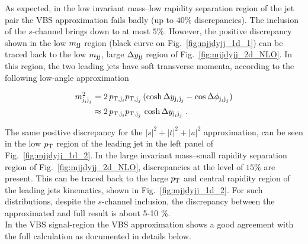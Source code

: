 As expected, in the low invariant mass--low rapidity separation region of the jet pair the VBS approximation fails badly (up to $40\%$ discrepancies).
The inclusion of the $s$-channel brings down to at most $5\%$.
However, the positive discrepancy shown in the low $m_{\text{j}\text{j}}$ region (black curve on Fig.~\ref{fig:mjjdyjj_1d_1}) can be traced back to the low $m_{\text{j}\text{j}}$, large $\Delta y_{\text{j}\text{j}}$ region of Fig.~\ref{fig:mjjdyjj_2d_NLO}.
In this region, the two leading jets have soft transverse momenta, according to the following low-angle approximation

\begin{equation}
\begin{split}
m_{\text{j}_i\text{j}_j}^2 &= 2\,p_{\text{T},\text{j}_i}p_{\text{T},\text{j}_j}\,(\cosh \Delta y_{\text{j}_i\text{j}_j} - \cos \Delta\phi_{\text{j}_i\text{j}_j}) \\
&\approx 2\,p_{\text{T},\text{j}_i}p_{\text{T},\text{j}_j}\,\cosh \Delta y_{\text{j}_i\text{j}_j} \,\,.
\end{split}
\end{equation}

The same positive discrepancy for the $|s|^2 + |t|^2 + |u|^2$ approximation, can be seen in the low $p_\text{T}$ region of the leading jet in the left panel of Fig.~\ref{fig:mjjdyjj_1d_2}.
In the large invariant mass--small rapidity separation region of Fig.~\ref{fig:mjjdyjj_2d_NLO}, discrepancies at the level of $15\%$ are present.
This can be traced back to the large $p_\text{T}$ and central rapidity region of the leading jets kinematics, shown in Fig.~\ref{fig:mjjdyjj_1d_2}. For such distributions, despite the $s$-channel inclusion, the discrepancy between the approximated and full result is about 5-10 \%.\\
In the VBS signal-region the VBS approximation shows a good agreement with the full calculation as documented in details below.

